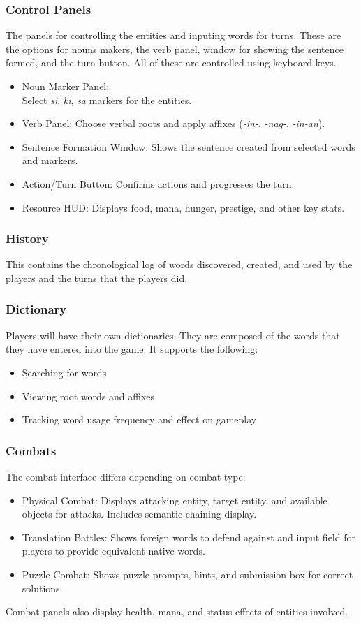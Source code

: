 \documentclass[11pt]{article}
\begin{document}
\subsubsection{Control Panels}
The panels for controlling the entities and inputing words for turns. These are the options for nouns makers, the verb panel, window for showing the sentence formed, and the turn button. All of these are controlled using keyboard keys.
\begin{itemize}
\item Noun Marker Panel:\\
  Select \textit{si}, \textit{ki}, \textit{sa} markers for the entities.
\item Verb Panel: Choose verbal roots and apply affixes (\textit{-in-}, \textit{-nag-}, \textit{-in-an}).
\item Sentence Formation Window: Shows the sentence created from selected words and markers.
\item Action/Turn Button: Confirms actions and progresses the turn.
\item Resource HUD: Displays food, mana, hunger, prestige, and other key stats.
\end{itemize}

\subsubsection{History}
This contains the chronological log of words discovered, created, and used by the players and the turns that the players did.

\subsubsection{Dictionary}
Players will have their own dictionaries. They are composed of the words that they have entered into the game. It supports the following:
\begin{itemize}
\item Searching for words
\item Viewing root words and affixes
\item Tracking word usage frequency and effect on gameplay
\end{itemize}

\subsubsection{Combats}
The combat interface differs depending on combat type:
\begin{itemize}
\item Physical Combat: Displays attacking entity, target entity, and available objects for attacks. Includes semantic chaining display.
\item Translation Battles: Shows foreign words to defend against and input field for players to provide equivalent native words.
\item Puzzle Combat: Shows puzzle prompts, hints, and submission box for correct solutions.
\end{itemize}
Combat panels also display health, mana, and status effects of entities involved.
\end{document}

